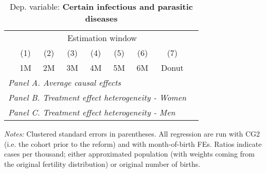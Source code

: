  \begin{table}[H] \begin{threeparttable} \centering \caption{Dep. variable: \textbf{Certain infectious and parasitic diseases}} {\def\sym#1{\ifmmode^{#1}\else\(^{#1}\)\fi} \begin{tabular}{l*{8}{c}} \toprule & \multicolumn{7}{c}{Estimation window} \\ \cmidrule(lr){2-8}
            &\multicolumn{1}{c}{(1)}&\multicolumn{1}{c}{(2)}&\multicolumn{1}{c}{(3)}&\multicolumn{1}{c}{(4)}&\multicolumn{1}{c}{(5)}&\multicolumn{1}{c}{(6)}&\multicolumn{1}{c}{(7)}\\
            &\multicolumn{1}{c}{1M}&\multicolumn{1}{c}{2M}&\multicolumn{1}{c}{3M}&\multicolumn{1}{c}{4M}&\multicolumn{1}{c}{5M}&\multicolumn{1}{c}{6M}&\multicolumn{1}{c}{Donut}\\
\midrule
 \multicolumn{8}{l}{\emph{Panel A. Average causal effects}} \\       \midrule\multicolumn{8}{l}{\emph{Panel B. Treatment effect heterogeneity - Women}} \\       \midrule\multicolumn{8}{l}{\emph{Panel C. Treatment effect heterogeneity - Men}} \\       
\bottomrule \end{tabular} } \begin{tablenotes} \item \scriptsize \emph{Notes:} Clustered standard errors in parentheses. All regression are run with CG2 (i.e. the cohort prior to the reform) and with month-of-birth FEs. Ratios indicate cases per thousand; either approximated population (with weights coming from the original fertility distribution) or original number of births. \end{tablenotes} \end{threeparttable} \end{table} 
